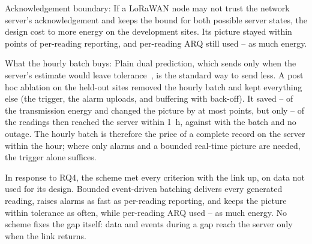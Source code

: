Acknowledgement boundary: If a LoRaWAN node may not trust the network server's acknowledgement and keeps the bound for both possible server states, the design cost \ackCostMin{} to \ackCostMax{} more energy on the development sites. Its picture stayed within \ackPicWorst{} points of per-reading reporting, and per-reading ARQ still used \ackArqOverMin--\ackArqOverMax{} as much energy.

What the hourly batch buys: Plain dual prediction, which sends only when the server's estimate would leave tolerance~\cite{dias2016survey,santini2006adaptive}, is the standard way to send less. A post hoc ablation on the held-out sites removed the hourly batch and kept everything else (the trigger, the alarm uploads, and buffering with back-off). It saved \noBatchSaveMin--\noBatchSaveMax{} of the transmission energy and changed the picture by at most \noBatchPicMaxDiff{} points, but only \noBatchHourMin--\noBatchHourMax{} of the readings then reached the server within 1~h, against \noBatchHourNoneFinal{} with the batch and no outage. The hourly batch is therefore the price of a complete record on the server within the hour; where only alarms and a bounded real-time picture are needed, the trigger alone suffices.

In response to RQ4, the scheme met every criterion with the link up, on data not used for its design. Bounded event-driven batching delivers every generated reading, raises alarms as fast as per-reading reporting, and keeps the picture within tolerance as often, while per-reading ARQ used \arqOverBoundedMinConf--\arqOverBoundedMaxConf{} as much energy. No scheme fixes the gap itself: data and events during a gap reach the server only when the link returns.
